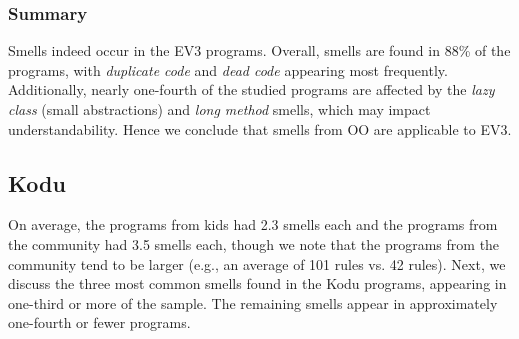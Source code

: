 \documentclass[conference]{IEEEtran}
\newcommand{\mbs}{\textsc{my blocks}}
\newcommand{\mb}{\textsc{my block}}
\begin{document}

\subsubsection{Summary}
Smells indeed occur in the EV3 programs. Overall, smells are found in 88\% of the programs, with \emph{duplicate code} and \emph{dead code} appearing most frequently. Additionally, nearly one-fourth of the studied programs are affected by the  \emph{lazy class} (small abstractions)  and \emph{long method} smells, which may impact understandability.  Hence we conclude that smells from OO are applicable to EV3. %


\subsection{Kodu}
On average, the programs from kids had 2.3 smells each and the programs from the community had 3.5 smells each, though we note that the programs from the community tend to be larger (e.g., an average of 101 rules vs. 42 rules). Next, we discuss the three most common smells found in the Kodu programs, appearing in one-third or more of the sample. The remaining smells appear in approximately one-fourth or fewer programs. 
\end{document}

